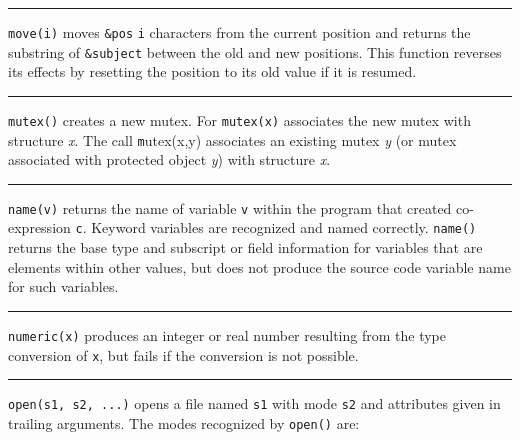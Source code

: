 \bigskip\hrule\vspace{0.1cm}

\noindent
{}\texttt{move(i)} moves \texttt{\&pos} \texttt{i}
characters from the current position and returns the substring of
\texttt{\&subject} between the old and new positions. This function
reverses its effects by resetting the position to its old value if it
is resumed.

\bigskip\hrule\vspace{0.1cm}

\noindent
{}\texttt{mutex()} creates a new mutex. For \texttt{mutex(x)}
associates the new mutex with structure {\textit x}.
The call {\texttt mutex(x,y)} associates an existing mutex \textit{y} (or
mutex associated with protected object \textit{y}) with
structure {\textit x}.

\bigskip\hrule\vspace{0.1cm}

\noindent
{}\texttt{name(v)} returns the name of variable \texttt{v}
within the program that created co-expression \texttt{c}. Keyword
variables are recognized and named correctly. \texttt{name()} returns
the base type and subscript or field information for variables that are
elements within other values, but does not produce the source code
variable name for such variables. 

\bigskip\hrule\vspace{0.1cm}

\noindent
{}\texttt{numeric(x)} produces an integer or real
number resulting from the type conversion of \texttt{x}, but fails if
the conversion is not possible.

\bigskip\hrule\vspace{0.1cm}

\noindent
{}\texttt{open(s1, s2, ...)} opens a file named
\texttt{s1} with mode \texttt{s2} and attributes given in trailing
arguments. The modes recognized by \texttt{open()} are: 

